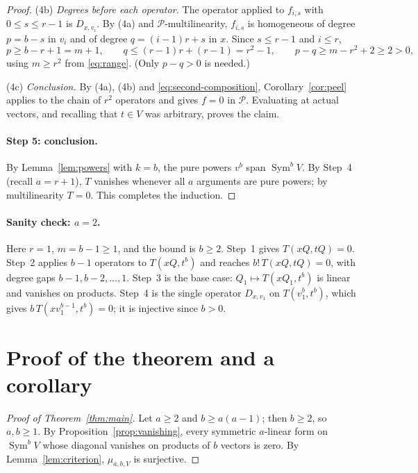 \documentclass[11pt]{article}
\theoremstyle{remark}
\DeclareMathOperator{\Sym}{Sym}
\newcommand{\D}[2]{D_{#1,#2}}
\newcommand{\PP}{\mathcal P}
\begin{document}
\begin{proof}
(4b) \emph{Degrees before each operator.} The operator applied to $f_{i,s}$
with $0\le s\le r-1$ is $\D{x}{v_i}$. By (4a) and $\PP$-multilinearity,
$f_{i,s}$ is homogeneous of degree $p=b-s$ in $v_i$ and of degree
$q=(i-1)r+s$ in $x$. Since $s\le r-1$ and $i\le r$,
\[
 p\ge b-r+1=m+1,\qquad q\le(r-1)r+(r-1)=r^2-1,\qquad
 p-q\ge m-r^2+2\ge2>0,
\]
using $m\ge r^2$ from \eqref{eq:range}. (Only $p-q>0$ is needed.)

(4c) \emph{Conclusion.} By (4a), (4b) and \eqref{eq:second-composition},
Corollary~\ref{cor:peel} applies to the chain of $r^2$ operators and gives
$f=0$ in $\PP$. Evaluating at actual vectors, and recalling that $t\in V$
was arbitrary, proves the claim.

\paragraph{Step 5: conclusion.}
By Lemma~\ref{lem:powers} with $k=b$, the pure powers $v^b$ span
$\Sym^bV$. By Step~4 (recall $a=r+1$), $T$ vanishes whenever all $a$
arguments are pure powers; by multilinearity $T=0$. This completes the
induction.
\end{proof}

\paragraph{Sanity check: $a=2$.}
Here $r=1$, $m=b-1\ge1$, and the bound is $b\ge2$. Step~1 gives
$T(xQ,tQ)=0$. Step~2 applies $b-1$ operators to $T(xQ,t^b)$ and reaches
$b!\,T(xQ,tQ)=0$, with degree gaps $b-1,b-2,\dots,1$. Step~3 is the base
case: $Q_1\mapsto T(xQ_1,t^b)$ is linear and vanishes on products. Step~4
is the single operator $\D{x}{v_1}$ on $T(v_1^b,t^b)$, which gives
$b\,T(xv_1^{b-1},t^b)=0$; it is injective since $b>0$.

\section{Proof of the theorem and a corollary}\label{sec:comparison}

\begin{proof}[Proof of Theorem~\ref{thm:main}]
Let $a\ge2$ and $b\ge a(a-1)$; then $b\ge2$, so $a,b\ge1$. By
Proposition~\ref{prop:vanishing}, every symmetric $a$-linear form on
$\Sym^bV$ whose diagonal vanishes on products of $b$ vectors is zero. By
Lemma~\ref{lem:criterion}, $\mu_{a,b,V}$ is surjective.
\end{proof}
\end{document}
